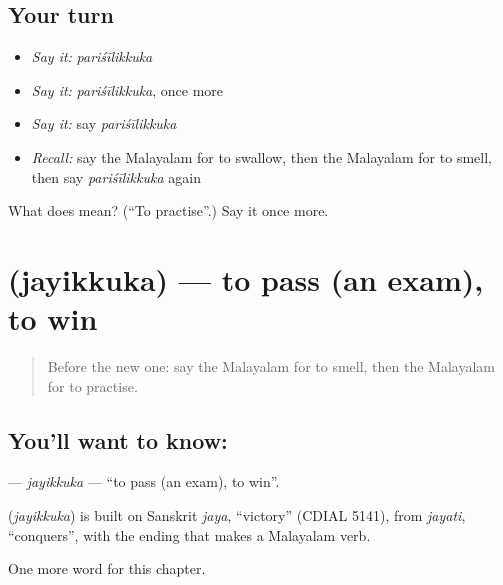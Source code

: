 \subsection*{Your turn}
\begin{itemize}
\raggedright
  \item \emph{Say it:} \emph{pariśīlikkuka}
  \item \emph{Say it:} \emph{pariśīlikkuka}, once more
  \item \emph{Say it:} say \emph{pariśīlikkuka}
  \item \emph{Recall:} say the Malayalam for to swallow, then the Malayalam for to smell, then say \emph{pariśīlikkuka} again
\end{itemize}

\begin{tcolorbox}[breakable,colback=teal!4,colframe=teal!35!black,title={Before you move on}]
What does  mean? (\textquotedblleft{}To practise\textquotedblright{}.) Say it once more.
\end{tcolorbox}
\section[\texorpdfstring{\ml{ജയിക്കുക} (jayikkuka)}{ജയിക്കുക (jayikkuka)}]{ (jayikkuka) — to pass (an exam), to win}

\label{lesson:ML-C267-jayikkuka}



\begin{quote}
Before the new one: say the Malayalam for to smell, then the Malayalam for to practise.
\end{quote}

\subsection*{You'll want to know: }
\textbf{} — \emph{jayikkuka} — \textquotedblleft{}to pass (an exam), to win\textquotedblright{}.

\begin{cousinweb}
\textbf{} (\emph{jayikkuka}) is built on Sanskrit \emph{jaya}, \textquotedblleft{}victory\textquotedblright{} (CDIAL 5141), from \emph{jayati}, \textquotedblleft{}conquers\textquotedblright{}, with the ending that makes a Malayalam verb.
\end{cousinweb}

\begin{grammarlens}[title={What you've built}]
One more word for this chapter.
\end{grammarlens}

